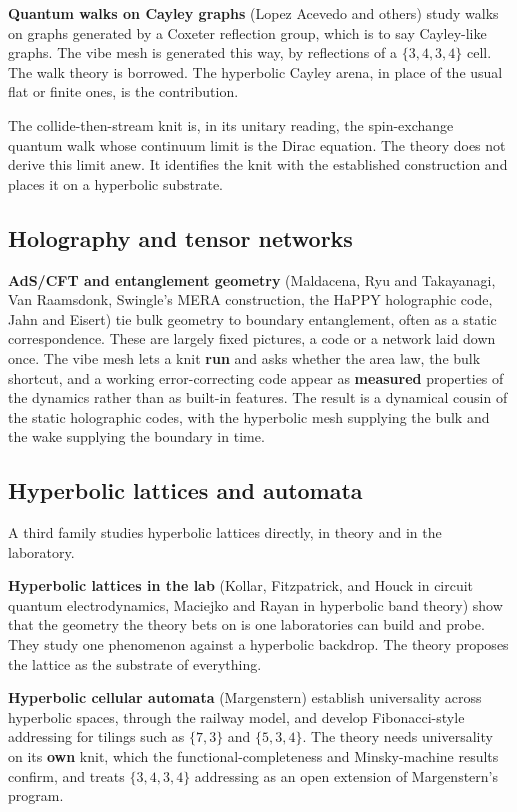 \textbf{Quantum walks on Cayley graphs} (Lopez Acevedo and others) study walks on graphs generated by a Coxeter reflection group, which is to say Cayley-like graphs. The vibe mesh is generated this way, by reflections of a $\{3,4,3,4\}$ cell. The walk theory is borrowed. The hyperbolic Cayley arena, in place of the usual flat or finite ones, is the contribution.

\begin{result}
The collide-then-stream knit is, in its unitary reading, the spin-exchange quantum walk whose continuum limit is the Dirac equation. The theory does not derive this limit anew. It identifies the knit with the established construction and places it on a hyperbolic substrate.
\end{result}

\subsection{Holography and tensor networks}

\textbf{AdS/CFT and entanglement geometry} (Maldacena, Ryu and Takayanagi, Van Raamsdonk, Swingle's MERA construction, the HaPPY holographic code, Jahn and Eisert) tie bulk geometry to boundary entanglement, often as a static correspondence. These are largely fixed pictures, a code or a network laid down once. The vibe mesh lets a knit \textbf{run} and asks whether the area law, the bulk shortcut, and a working error-correcting code appear as \textbf{measured} properties of the dynamics rather than as built-in features. The result is a dynamical cousin of the static holographic codes, with the hyperbolic mesh supplying the bulk and the wake supplying the boundary in time.

\subsection{Hyperbolic lattices and automata}

A third family studies hyperbolic lattices directly, in theory and in the laboratory.

\textbf{Hyperbolic lattices in the lab} (Kollar, Fitzpatrick, and Houck in circuit quantum electrodynamics, Maciejko and Rayan in hyperbolic band theory) show that the geometry the theory bets on is one laboratories can build and probe. They study one phenomenon against a hyperbolic backdrop. The theory proposes the lattice as the substrate of everything.

\textbf{Hyperbolic cellular automata} (Margenstern) establish universality across hyperbolic spaces, through the railway model, and develop Fibonacci-style addressing for tilings such as $\{7,3\}$ and $\{5,3,4\}$. The theory needs universality on its \textbf{own} knit, which the functional-completeness and Minsky-machine results confirm, and treats $\{3,4,3,4\}$ addressing as an open extension of Margenstern's program.

